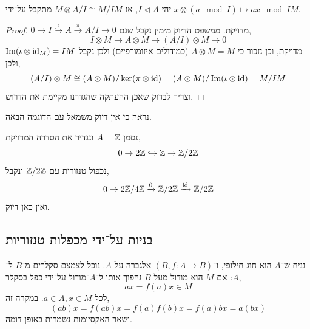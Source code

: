 \begin{corollary}
	יהי $I \triangleleft A$, אז $M \otimes A / I \cong M / I M$ מתקבל על־ידי $x \otimes (a \mod I) \mapsto a x \mod I M$.
\end{corollary}
\begin{proof}
	$0 \to I \overset{\iota}{\hookrightarrow} A \xrightarrow{\pi} A / I \to 0$ מדויקת.
	ממשפט הדיוק מימין נקבל שגם,
	\[
		I \otimes M
		\to A \otimes M
		\to (A / I) \otimes M
		\to 0
	\]
	מדויקת, וכן נזכור כי $A \otimes M = M$ (כמודולים איזומורפיים) ולכן נקבל $\operatorname{Im}(\iota \otimes \operatorname{id}_M) = I M$ ולכן,
	\[
		(A / I) \otimes M
		\cong (A \otimes M) / \ker(\pi \otimes \operatorname{id})
		= (A \otimes M) / \operatorname{Im}(\iota \otimes \operatorname{id})
		= M / I M
	\]
	וצריך לבדוק שאכן ההעתקה שהגדרנו מקיימת את הדרוש.
\end{proof}
נראה כי אין דיוק משמאל עם הדוגמה הבאה.
\begin{example}
	נסמן $A = \mathbb{Z}$ ונגדיר את הסדרה המדויקת,
	\[
		0
		\to 2 \mathbb{Z}
		\hookrightarrow \mathbb{Z}
		\to \mathbb{Z} / 2 \mathbb{Z}
	\]
	נכפול טנזורית עם $\mathbb{Z} / 2 \mathbb{Z}$ ונקבל,
	\[
		0
		\to 2 \mathbb{Z} / 4 \mathbb{Z}
		\xrightarrow{0} \mathbb{Z} / 2 \mathbb{Z}
		\xrightarrow{\operatorname{id}} \mathbb{Z} / 2 \mathbb{Z}
	\]
	ואין כאן דיוק.
\end{example}

\subsection{בניות על־ידי מכפלות טנזוריות}
נניח ש־$A$ הוא חוג חילופי, ו־$(B, f : A \to B)$ אלגברה על $A$.
נוכל לצמצם סקלרים מ־$B$ ל־$A$:
אם $M$ הוא מודול מעל $B$ נהפוך אותו ל־$A$־מודול על־ידי כפל בסקלר,
\[
	a x
	= f(a) x
	\in M
\]
לכל $a \in A, x \in M$.
במקרה זה,
\[
	(a b) x
	= f(a b) x
	= f(a) f(b) x
	= f(a) b x
	= a (b x)
\]
ושאר האקסיומות נשמרות באופן דומה.


